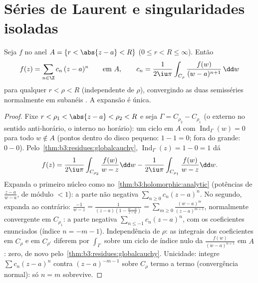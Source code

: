 \section{Séries de Laurent e singularidades isoladas}

\begin{theorem}\label{thm:b3:residues:laurent}
Seja $f$  no anel $A = \{r < \abs{z - a} <
R\}$ ($0 \leq r < R \leq \infty$). Então
\[
f(z) = \sum_{n\in\Z}c_n\,(z - a)^n
\qquad\text{em } A,
\qquad
c_n = \frac1{2\iu\pi}\int_{C_\rho}\frac{f(w)}{(w -
a)^{n+1}}\,\dd w
\]
para qualquer $r < \rho < R$ (independente de $\rho$), convergindo as duas
semisséries normalmente em subanéis . A expansão é única.
\end{theorem}

\begin{proof}
Fixe $r < \rho_1 < \abs{z - a} < \rho_2 < R$ e seja $\Gamma =
C_{\rho_2} - C_{\rho_1}$ (o externo no sentido anti-horário, o interno no
horário): um ciclo em $A$ com $\operatorname{Ind}_\Gamma(w) = 0$ para todo $w \notin A$ (pontos dentro do
disco pequeno: $1 - 1 = 0$; fora do grande: $0 - 0$). Pelo~\cref{thm:b3:residues:globalcauchy},
$\operatorname{Ind}_\Gamma(z) = 1 - 0 = 1$ dá
\[
f(z) = \frac1{2\iu\pi}\int_{C_{\rho_2}}\frac{f(w)}{w - z}\dd
w - \frac1{2\iu\pi}\int_{C_{\rho_1}}\frac{f(w)}{w - z}\dd w .
\]
Expanda o primeiro núcleo como no~\cref{thm:b3:holomorphic:analytic} (potências de $\frac{z -
a}{w - a}$, de
módulo $< 1$): a parte não negativa $\sum_{n\geq0}c_n(z-a)^n$. No segundo, expanda ao
contrário: $\frac{-1}{w - z} = \frac1{(z-a)(1 - \frac{w - a}{z -
a})} = \sum_{m\geq0}\frac{(w-a)^m}{(z - a)^{m+1}}$, normalmente convergente em $C_{\rho_1}$: a parte negativa
$\sum_{n\leq-1}c_n(z-a)^n$, com os coeficientes enunciados (índice $n = -m-1$). Independência de
$\rho$: as integrais dos coeficientes em $C_{\rho}$ e em $C_{\rho'}$ diferem por
$\int_\Gamma$ sobre um ciclo de índice nulo da  $\frac{f(w)}{(w-a)^{n+1}}$ em $A$:
zero, de novo pelo~\cref{thm:b3:residues:globalcauchy}. Unicidade: integre $\sum c_n(z-a)^n$ contra $(z - a)^{-m-1}$
sobre $C_\rho$ termo a termo (convergência normal): só $n = m$
sobrevive.
\end{proof}

